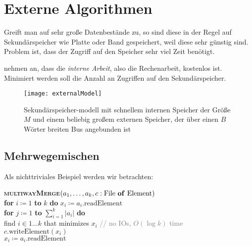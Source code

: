 \chapter{Externe Algorithmen}

\begin{minipage}{.6\textwidth}
  Greift man auf sehr große Datenbestände zu, so sind diese in der Regel auf Sekundärspeicher wie Platte oder Band gespeichert, weil diese sehr günstig sind. Problem ist, dass der Zugriff auf den Speicher sehr viel Zeit benötigt.
  
   nehmen an, dass die \emph{interne Arbeit}, also die Rechenarbeit, kostenlos ist. Minimiert werden soll die Anzahl an Zugriffen auf den Sekundärspeicher.
\end{minipage}
\hfill
\begin{minipage}{.35\textwidth}
  \begin{figure}[H]
    \texttt{[image: externalModel]}
    \caption{Sekundärspeicher-modell mit schnellem internen Speicher der Größe \( M \) und einem beliebig großem externen Speicher, der über einen \( B \) Wörter breiten Bus angebunden ist}
  \end{figure}
\end{minipage}

\section{Mehrwegemischen}

Als nichttriviales Beispiel werden wir  betrachten:

\begin{pseudocode}
  \textbf{\textsc{multiwayMerge}}\( (a_1,\dots,a_k,c : \text{File \textbf{of} Element}) \) \\
  \phantom{\enskip} \textbf{for} \( i \coloneqq 1 \) \textbf{to} \( k \) \textbf{do} \( x_i \coloneqq a_i\text{.readElement} \) \\
  \phantom{\enskip} \textbf{for} \( j \coloneqq 1 \) \textbf{to} \( \sum_{i=1}^k \left\vert a_i \right\vert \) \textbf{do} \\
  \phantom{\enskip} \phantom{\enskip} find \( i \in 1\dots k \) that minimizes \( x_i \) \enskip{} \textcolor{gray}{// no IOs, \( O(\log k) \) time} \\
  \phantom{\enskip} \phantom{\enskip} \( c\text{.writeElement}(x_i) \) \\
  \phantom{\enskip} \phantom{\enskip} \( x_i \coloneqq a_i\text{.readElement} \)
\end{pseudocode}

